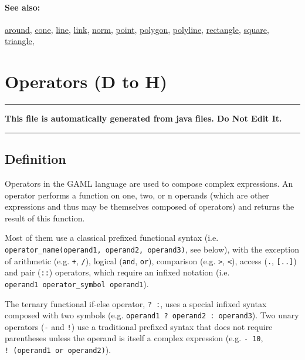 \documentclass[]{book}
\theoremstyle{definition}
\theoremstyle{definition}
\theoremstyle{definition}
\theoremstyle{remark}
\begin{document}
\subsubsection{See also:}\label{see-also-75}

\href{operators-a-to-a.html\#around}{around},
\href{operators-b-to-c.html\#cone}{cone},
\href{operators-i-to-m.html\#line}{line},
\href{operators-i-to-m.html\#link}{link},
\href{operators-n-to-r.html\#norm}{norm},
\href{operators-n-to-r.html\#point}{point},
\href{operators-n-to-r.html\#polygon}{polygon},
\href{operators-n-to-r.html\#polyline}{polyline},
\href{operators-n-to-r.html\#rectangle}{rectangle},
\href{operators-s-to-z.html\#square}{square},
\href{operators-s-to-z.html\#triangle}{triangle},

\chapter{Operators (D to H)}\label{operators-d-to-h}

\begin{center}\rule{0.5\linewidth}{\linethickness}\end{center}

\textbf{This file is automatically generated from java files. Do Not
Edit It.}

\begin{center}\rule{0.5\linewidth}{\linethickness}\end{center}

\section{Definition}\label{definition-2}

Operators in the GAML language are used to compose complex expressions.
An operator performs a function on one, two, or n operands (which are
other expressions and thus may be themselves composed of operators) and
returns the result of this function.

Most of them use a classical prefixed functional syntax (i.e.
\texttt{operator\_name(operand1,\ operand2,\ operand3)}, see below),
with the exception of arithmetic (e.g. \texttt{+}, \texttt{/}), logical
(\texttt{and}, \texttt{or}), comparison (e.g. \texttt{\textgreater{}},
\texttt{\textless{}}), access (\texttt{.}, \texttt{{[}..{]}}) and pair
(\texttt{::}) operators, which require an infixed notation (i.e.
\texttt{operand1\ operator\_symbol\ operand1}).

The ternary functional if-else operator, \texttt{?\ :}, uses a special
infixed syntax composed with two symbols (e.g.
\texttt{operand1\ ?\ operand2\ :\ operand3}). Two unary operators
(\texttt{-} and \texttt{!}) use a traditional prefixed syntax that does
not require parentheses unless the operand is itself a complex
expression (e.g. \texttt{-\ 10}, \texttt{!\ (operand1\ or\ operand2)}).
\end{document}
